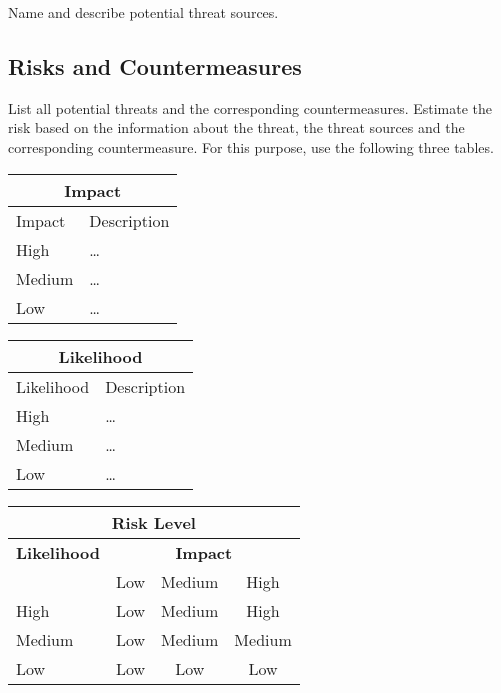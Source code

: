 \documentclass{article}
\begin{document}
Name and describe potential threat sources.

\subsection{Risks and Countermeasures}

List all potential threats and the
  corresponding countermeasures. Estimate the risk based on 
  the information about the threat, the threat sources and the 
  corresponding countermeasure. For this purpose, use the following three
  tables.


\begin{center}
\begin{tabular}{|l|l|}
\hline
\multicolumn{2}{|c|}{\bf Impact} \\
\hline
Impact & Description \\
\hline
\hline
High   & \hspace*{20pt}\ldots \\
\hline
Medium & \hspace*{20pt}\ldots \\
\hline
Low   & \hspace*{20pt}\ldots \\
\hline
\end{tabular}
%
%
\begin{tabular}{|l|l|}
\hline
\multicolumn{2}{|c|}{\bf Likelihood} \\
\hline
Likelihood & Description \\
\hline
\hline
High   & \hspace*{20pt}\ldots \\
\hline
Medium & \hspace*{20pt}\ldots \\
\hline
Low   & \hspace*{20pt}\ldots \\
\hline
\end{tabular}
\end{center}

\vspace{5mm}

\begin{center}
\begin{tabular}{|l|c|c|c|}
\hline
\multicolumn{4}{|c|}{{\bf Risk Level}} \\
\hline
{{\bf Likelihood}} & \multicolumn{3}{c|}{{\bf Impact}} \\ %
     & Low & Medium & High \\  \hline
 High & Low & Medium & High  \\
\hline
 Medium & Low & Medium & Medium \\
\hline
 Low & Low & Low & Low \\
\hline
\end{tabular}
\end{center}
\end{document}
